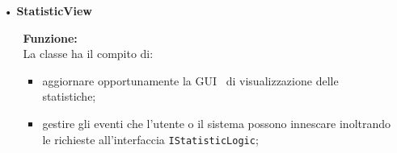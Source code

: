 {\begin{sloppypar}
{\begin{itemize}
\begin{itemize}
				\item[]  \textbf{Metodi:}\\
				\texttt{+ void removeViewStatistic();}\\
				Nasconde la GUI\g~ di visualizzazione statistiche.\\

				\texttt{+ void loadViewStatistic();}\\
				Visualizza la GUI\g~ che mostra le statistiche.\\
				
				\texttt{+ void setListData(Vector<Vector<String>> list);}\\
				Inserisce nella tabella contenente le statistiche i dati contenuti nel parametro \texttt{list}.\\
				
				\texttt{+ void errorView(String error);}\\
				Imposta e rende visibile il messaggio di errore.\\
				
				\texttt{+ void loadListBox(Vector<String> users);}\\
				Inserisce gli utenti registrati contenuti nel vettore \texttt{users} all’interno del pannello \texttt{ListBox}.\\
				
				\texttt{+ void setUsenameLabel(String username);}\\
				Imposta l'etichetta \texttt{LabelUser} con il nome dell'amministratore autenticato.\\
				
				\texttt{+ void windowClosing();}\\
				Gestisce l'evento di chiusura della finestra della GUI\g~ di  visualizzazione delle statistiche effettuando il logout.\\
			\end{itemize}
		
		\item[•] \textbf{StatisticView}
			\begin{itemize}
				\item[]  \textbf{Funzione:} \\
				La classe ha il compito di:
				\begin{itemize}
					\item aggiornare opportunamente la GUI\g~ di visualizzazione delle statistiche;
					\item gestire gli eventi che l’utente o il sistema possono innescare inoltrando le richieste all'interfaccia \texttt{IStatisticLogic};
				\end{itemize}
				

\end{itemize}
\end{itemize}}
\end{sloppypar}}
